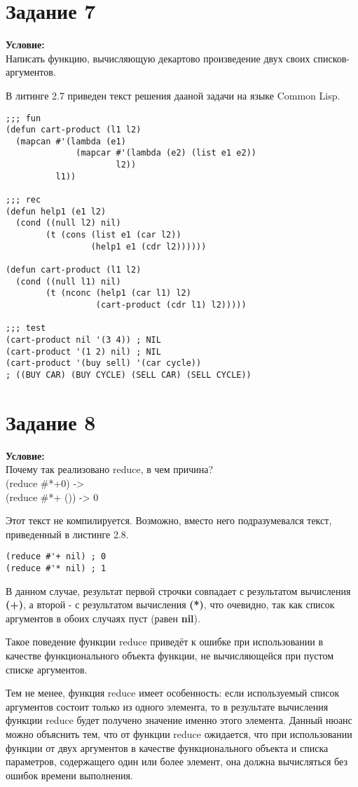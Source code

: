 \section{Задание \No{}7}
\textbf{Условие:}\\Написать функцию, вычисляющую декартово произведение двух своих списков-аргументов.

В литинге 2.7 приведен текст решения дааной задачи на языке Common Lisp.

\begin{lstlisting}[caption={Задание \No{}7}]
;;; fun
(defun cart-product (l1 l2)
  (mapcan #'(lambda (e1)
              (mapcar #'(lambda (e2) (list e1 e2))
                      l2))
          l1))

;;; rec
(defun help1 (e1 l2)
  (cond ((null l2) nil)
        (t (cons (list e1 (car l2))
                 (help1 e1 (cdr l2))))))

(defun cart-product (l1 l2)
  (cond ((null l1) nil)
        (t (nconc (help1 (car l1) l2)
                  (cart-product (cdr l1) l2)))))

;;; test
(cart-product nil '(3 4)) ; NIL
(cart-product '(1 2) nil) ; NIL
(cart-product '(buy sell) '(car cycle))
; ((BUY CAR) (BUY CYCLE) (SELL CAR) (SELL CYCLE))
\end{lstlisting}

\section{Задание \No{}8}
\textbf{Условие:}\\Почему так реализовано reduce, в чем причина?\\(reduce #*+0) ->\\(reduce #*+ ()) -> 0

Этот текст не компилируется. Возможно, вместо него подразумевался текст, приведенный в листинге 2.8.
\begin{lstlisting}[caption={Задание \No{}8}]
(reduce #'+ nil) ; 0
(reduce #'* nil) ; 1
\end{lstlisting}

В данном случае, результат первой строчки совпадает с результатом вычисления \textbf{(+)}, а второй - с результатом вычисления \textbf{(*)}, что очевидно, так как список аргументов в обоих случаях пуст (равен \textbf{nil}).

Такое поведение функции reduce приведёт к ошибке при использовании в качестве функционального объекта функции, не вычисляющейся при пустом списке аргументов.

Тем не менее, функция reduce имеет особенность: если используемый список аргументов состоит только из одного элемента, то в результате вычисления функции reduce будет получено значение именно этого элемента. Данный нюанс можно объяснить тем, что от функции reduce ожидается, что при использовании функции от двух аргументов в качестве функционального объекта и списка параметров, содержащего один или более элемент, она должна вычисляться без ошибок времени выполнения.

